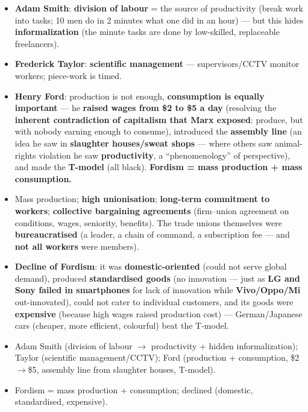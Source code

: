 \begin{KeyConcept}
\begin{itemize}
    \item \textbf{Adam Smith}: \textbf{division of labour} = the source of productivity (break work into tasks; 10 men do in 2 minutes what one did in an hour) --- but this hides \textbf{informalization} (the minute tasks are done by low-skilled, replaceable freelancers).
    \item \textbf{Frederick Taylor}: \textbf{scientific management} --- supervisors/CCTV monitor workers; piece-work is timed.
    \item \textbf{Henry Ford}: production is not enough, \textbf{consumption is equally important} --- he \textbf{raised wages from \$2 to \$5 a day} (resolving the \textbf{inherent contradiction of capitalism that Marx exposed}: produce, but with nobody earning enough to consume), introduced the \textbf{assembly line} (an idea he saw in \textbf{slaughter houses/sweat shops} --- where others saw animal-rights violation he saw \textbf{productivity}, a ``phenomenology'' of perspective), and made the \textbf{T-model} (all black). \textbf{Fordism = mass production + mass consumption.}
\end{itemize}
\end{KeyConcept}

\begin{KeyConcept}
\begin{itemize}
    \item Mass production; \textbf{high unionisation}; \textbf{long-term commitment to workers}; \textbf{collective bargaining agreements} (firm--union agreement on conditions, wages, seniority, benefits). The trade unions themselves were \textbf{bureaucratised} (a leader, a chain of command, a subscription fee --- and \textbf{not all workers} were members).
    \item \textbf{Decline of Fordism}: it was \textbf{domestic-oriented} (could not serve global demand), produced \textbf{standardised goods} (no innovation --- just as \textbf{LG and Sony failed in smartphones} for lack of innovation while \textbf{Vivo/Oppo/Mi} out-innovated), could not cater to individual customers, and its goods were \textbf{expensive} (because high wages raised production cost) --- German/Japanese cars (cheaper, more efficient, colourful) beat the T-model.
\end{itemize}
\end{KeyConcept}

\begin{QuickRevision}
\begin{itemize}
    \item Adam Smith (division of labour $\rightarrow$ productivity + hidden informalization); Taylor (scientific management/CCTV); Ford (production + consumption, \$2$\rightarrow$\$5, assembly line from slaughter houses, T-model).
    \item Fordism = mass production + consumption; declined (domestic, standardised, expensive).
\end{itemize}
\end{QuickRevision}

